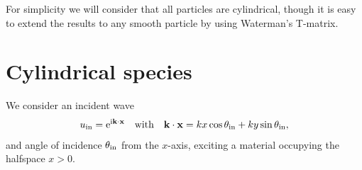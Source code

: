 \documentclass[12pt, a4paper]{article}
\begin{document}
For simplicity we will consider that all particles are cylindrical, though it is easy to extend the results to any smooth particle by using Waterman's T-matrix\cite{waterman_symmetry_1971,varadan_multiple_1978,mishchenko_t-matrix_1996}.



\section{Cylindrical species}

We consider an incident wave
\begin{gather}
  u_{\mathrm{in}} =  \textrm{e}^{\textrm{i} \mathbf k \cdot \mathbf x} \quad \text{with} \quad \mathbf k \cdot \mathbf x = k x \cos \theta_{\mathrm{in}}  + k y \sin \theta_{\mathrm{in}},
  \label{eqns:incident}
\end{gather}
and angle of incidence $\theta_{\mathrm{in}}$ from the $x$-axis, exciting a material occupying the halfspace $x>0$.
\end{document}
